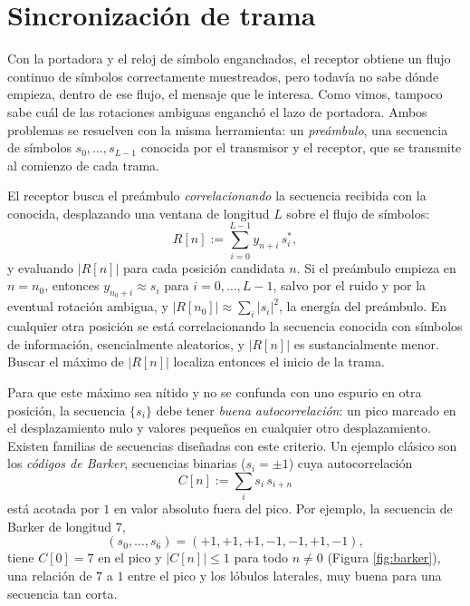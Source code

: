 \section{Sincronización de trama}\label{sec:sincronizacion trama}

Con la portadora y el reloj de símbolo enganchados, el receptor obtiene un flujo continuo de símbolos correctamente muestreados, pero todavía no sabe dónde empieza, dentro de ese flujo, el mensaje que le interesa. Como vimos, tampoco sabe cuál de las rotaciones ambiguas enganchó el lazo de portadora. Ambos problemas se resuelven con la misma herramienta: un \emph{preámbulo}, una secuencia de símbolos $s_0,\ldots,s_{L-1}$ conocida por el transmisor y el receptor, que se transmite al comienzo de cada trama.

El receptor busca el preámbulo \emph{correlacionando} la secuencia recibida con la conocida, desplazando una ventana de longitud $L$ sobre el flujo de símbolos:
\begin{equation*}
    R[n] := \sum_{i=0}^{L-1} y_{n+i}\, s_i^*,
\end{equation*}
y evaluando $|R[n]|$ para cada posición candidata $n$. Si el preámbulo empieza en $n=n_0$, entonces $y_{n_0+i}\approx s_i$ para $i=0,\ldots,L-1$, salvo por el ruido y por la eventual rotación ambigua, y $|R[n_0]|\approx\sum_i |s_i|^2$, la energía del preámbulo. En cualquier otra posición se está correlacionando la secuencia conocida con símbolos de información, esencialmente aleatorios, y $|R[n]|$ es sustancialmente menor. Buscar el máximo de $|R[n]|$ localiza entonces el inicio de la trama.

Para que este máximo sea nítido y no se confunda con uno espurio en otra posición, la secuencia $\{s_i\}$ debe tener \emph{buena autocorrelación}: un pico marcado en el desplazamiento nulo y valores pequeños en cualquier otro desplazamiento. Existen familias de secuencias diseñadas con este criterio. Un ejemplo clásico son los \emph{códigos de Barker}, secuencias binarias ($s_i=\pm 1$) cuya autocorrelación
\begin{equation*}
    C[n] := \sum_{i} s_i\, s_{i+n}
\end{equation*}
está acotada por $1$ en valor absoluto fuera del pico. Por ejemplo, la secuencia de Barker de longitud $7$,
\begin{equation*}
    (s_0,\ldots,s_6) = (+1,+1,+1,-1,-1,+1,-1),
\end{equation*}
tiene $C[0]=7$ en el pico y $|C[n]|\leqslant 1$ para todo $n\neq 0$ (Figura \ref{fig:barker}), una relación de $7$ a $1$ entre el pico y los lóbulos laterales, muy buena para una secuencia tan corta.

